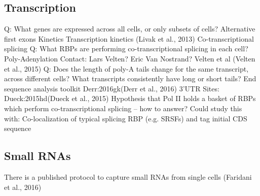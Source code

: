 \subsection{Transcription}
Q: What genes are expressed across all cells, or only subsets of cells?
Alternative first exons
Kinetics
Transcription kinetics (Livak et al., 2013)
Co-transcriptional splicing
Q: What RBPs are performing co-transcriptional splicing in each cell?
Poly-Adenylation
Contact: Lars Velten? Eric Van Nostrand?
Velten et al (Velten et al., 2015)
Q: Does the length of poly-A tails change for the same transcript, across different cells? What transcripts consistently have long or short tails?
End sequence analysis toolkit {Derr:2016gk}(Derr et al., 2016)
3’UTR Sites: {Dueck:2015hd}(Dueck et al., 2015)
Hypothesis that Pol II holds a basket of RBPs which perform co-transcriptional splicing -- how to answer?
Could study this with: Co-localization of typical splicing RBP (e.g. SRSFs) and tag initial CDS sequence 


\subsection{Small RNAs}
There is a published protocol to capture small RNAs from single cells (Faridani et al., 2016)

